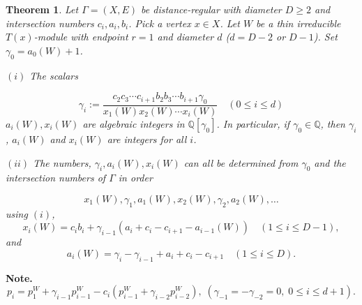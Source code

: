\documentclass[
]{book}
\newtheorem{theorem}{Theorem}[chapter]
\theoremstyle{definition}
\theoremstyle{definition}
\theoremstyle{definition}
\theoremstyle{definition}
\theoremstyle{remark}
\begin{document}
\begin{theorem}
\protect\hypertarget{thm:endpoint1}{}\label{thm:endpoint1}Let \(\Gamma = (X, E)\) be distance-regular with diameter \(D\geq 2\) and intersection numbers \(c_i, a_i, b_i\). Pick a vertex \(x\in X\). Let \(W\) be a thin irreducible \(T(x)\)-module with endpoint \(r = 1\) and diameter \(d\) (\(d = D-2\) or \(D-1\)). Set \(\gamma_0 = a_0(W) + 1\).

\((i)\) The scalars

\begin{equation}
\gamma_i := \frac{c_2c_3\cdots c_{i+1}b_2b_3\cdots b_{i+1}\gamma_0}{x_1(W)x_2(W)\cdots x_i(W)}   \quad (0\leq i\leq d)
\label{eq:gamma}
\end{equation}
\(a_i(W), x_i(W)\) are algebraic integers in \(\mathbb{Q}[\gamma_0]\). In particular, if \(\gamma_0\in \mathbb{Q}\), then \(\gamma_i\), \(a_i(W)\) and \(x_i(W)\) are integers for all \(i\).

\((ii)\) The numbers, \(\gamma_i, a_i(W), x_i(W)\) can all be determined from \(\gamma_0\) and the intersection numbers of \(\Gamma\) in order

\[x_1(W), \gamma_1, a_1(W), x_2(W), \gamma_2, a_2(W), \ldots \]
using \((i)\),
\begin{equation}
x_i(W) = c_ib_i + \gamma_{i-1}(a_i + c_i - c_{i+1} - a_{i-1}(W)) \quad (1\leq i\leq D-1), \label{eq:xi}
\end{equation}
and
\begin{equation}
a_i(W) = \gamma_i - \gamma_{i-1} + a_i + c_i - c_{i+1} \quad (1\leq i\leq D). \label{eq:ai}
\end{equation}
\end{theorem}

\textbf{Note.}
\[p_i = p_1^W + \gamma_{i-1}p^W_{i-1} - c_i(p_{i-1}^W + \gamma_{i-2}p_{i-2}^W), \; (\gamma_{-1} = -\gamma_{-2} = 0, \; 0\leq i\leq d+1).\]
\end{document}
